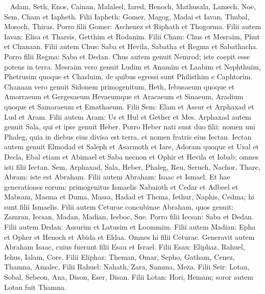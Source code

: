 
\begin{biblechapter}   
\verse Adam, Seth, Enos, 
\verse Cainan, Malaleel, Iared, 
\verse Henoch, Mathusala, Lamech, 
\verse Noe, Sem, Cham et Iapheth. 
\verse Filii Iapheth: Gomer, Magog, Madai et Iavan, Thubal, Mosoch, Thiras. 
\verse Porro filii Gomer: Aschenez et Riphath et Thogorma. 
\verse Filii autem Iavan: Elisa et Tharsis, Getthim et Rodanim. 
\verse Filii Cham: Chus et Mesraim, Phut et Chanaan. 
\verse Filii autem Chus: Saba et Hevila, Sabatha et Regma et Sabathacha. Porro filii Regma: Saba et Dedan. 
\verse Chus autem genuit Nemrod; iste coepit esse potens in terra. 
\verse Mesraim vero genuit Ludim et Anamim et Laabim et Nephthuim, 
\verse Phetrusim quoque et Chasluim, de quibus egressi sunt Philisthim e Caphtorim. 
\verse Chanaan vero genuit Sidonem primogenitum, Heth, 
\verse Iebusaeum quoque et Amorraeum et Gergesaeum 
\verse Hevaeumque et Aracaeum et Sinaeum, 
\verse Aradium quoque et Samaraeum et Emathaeum. 
\verse Filii Sem: Elam et Assur et Arphaxad et Lud et Aram. Filii autem Aram: Us et Hul et Gether et Mes. 
\verse Arphaxad autem genuit Sala, qui et ipse genuit Heber. 
\verse Porro Heber nati sunt duo filii: nomen uni Phaleg, quia in diebus eius divisa est terra, et nomen fratris eius Iectan. 
\verse Iectan autem genuit Elmodad et Saleph et Asarmoth et Iare, 
\verse Adoram quoque et Uzal et Decla,  
\verse Ebal etiam et Abimael et Saba necnon 
\verse et Ophir et Hevila et Iobab; omnes isti filii Iectan. 
\verse Sem, Arphaxad, Sala, 
\verse Heber, Phaleg, Reu, 
\verse Seruch, Nachor, Thare,  
\verse Abram: iste est Abraham. 
\verse Filii autem Abraham: Isaac et Ismael. 
\verse Et hae generationes eorum: primogenitus Ismaelis Nabaioth et Cedar et Adbeel et Mabsam, 
\verse Masma et Duma, Massa, Hadad et Thema, 
\verse Iethur, Naphis, Cedma; hi sunt filii Ismaelis. 
\verse Filii autem Ceturae concubinae Abraham, quos genuit: Zamran, Iecsan, Madan, Madian, Iesboc, Sue. Porro filii Iecsan: Saba et Dedan. Filii autem Dedan: Assurim et Latusim et Loommim. 
\verse Filii autem Madian: Epha et Opher et Henoch et Abida et Eldaa. Omnes hi filii Ceturae. 
\verse Generavit autem Abraham Isaac, cuius fuerunt filii Esau et Israel. 
\verse Filii Esau: Eliphaz, Rahuel, Iehus, Ialam, Core. 
\verse Filii Eliphaz: Theman, Omar, Sepho, Gatham, Cenez, Thamna, Amalec. 
\verse Filii Rahuel: Nahath, Zara, Samma, Meza. 
\verse Filii Seir: Lotan, Sobal, Sebeon, Ana, Dison, Eser, Disan. 
\verse Filii Lotan: Hori, Hemam; soror autem Lotan fuit Thamna. 

\end{biblechapter}
